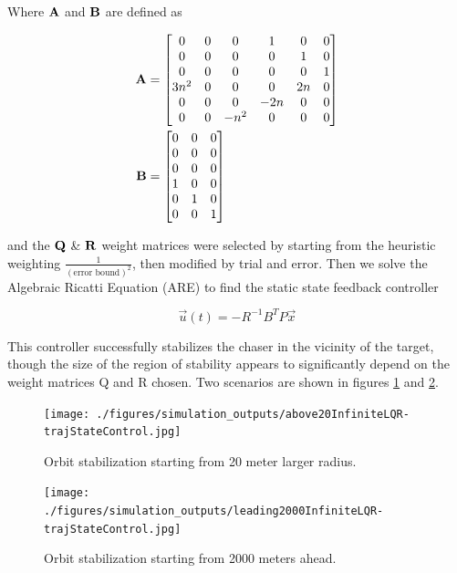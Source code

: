 \documentclass[conference]{IEEEtran}
\begin{document}
Where ${\bf A}$ and ${\bf B}$ are defined as


\begin{equation}
    \label{eq:linearized-state-space}
    \begin{aligned}
        {\bf A} & = \mat{
            0 & 0 & 0 & 1 & 0 & 0 \\
            0 & 0 & 0 & 0 & 1 & 0 \\
            0 & 0 & 0 & 0 & 0 & 1 \\
            3n^2 & 0 & 0 & 0 & 2n & 0 \\
            0 & 0 & 0 & -2n & 0 & 0 \\
            0 & 0 & -n^2 & 0 & 0 & 0 \\
        } \\
        {\bf B} & = \mat{
            0 & 0 & 0 \\
            0 & 0 & 0 \\
            0 & 0 & 0 \\
            1 & 0 & 0 \\
            0 & 1 & 0 \\
            0 & 0 & 1 \\
        }
    \end{aligned}
\end{equation}

and the ${\bf Q}$ \& ${\bf R}$ weight matrices were selected by starting from
the heuristic weighting $\frac{1}{(\text{error bound})^2}$, then modified by
trial and error. Then we solve the Algebraic Ricatti Equation (ARE) to find the
static state feedback controller

\begin{equation}
    \vec{u}(t) = -R^{-1}B^T P \vec{x}
\end{equation}

This controller successfully stabilizes the chaser in the vicinity of the
target, though the size of the region of stability appears to significantly
depend on the weight matrices Q and R chosen. Two scenarios are shown in
figures \ref{fig:above20} and \ref{fig:leading2000}.

\begin{figure}[t]
    \centerline{\texttt{[image: ./figures/simulation\_outputs/above20InfiniteLQR-trajStateControl.jpg]}}
    \caption{Orbit stabilization starting from 20 meter larger radius.}
    \label{fig:above20}
\end{figure}

\begin{figure}[t]
    \centerline{\texttt{[image: ./figures/simulation\_outputs/leading2000InfiniteLQR-trajStateControl.jpg]}}
    \caption{Orbit stabilization starting from 2000 meters ahead.}
    \label{fig:leading2000}
\end{figure}
\end{document}
